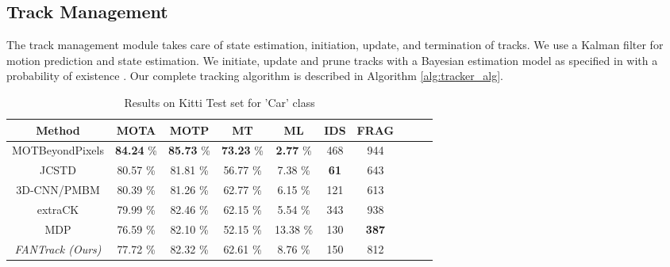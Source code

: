 \documentclass[letterpaper, 10 pt, conference]{ieeeconf}
\begin{document}
\subsection{Track Management}
The track management module takes care of state estimation, initiation, update, and termination of tracks. We use a Kalman filter for motion prediction and state estimation. We initiate, update and prune tracks with a Bayesian estimation model as specified in \cite{Pak2016JointTD} with a probability of existence . Our complete tracking algorithm is described in Algorithm \ref{alg:tracker_alg}.

\begin{table*}[ht]
\vspace{1.5em}
\caption{Results on Kitti Test set for 'Car' class}
\centering
\begin{tabular}{c | c | c | c | c | c | c | c | c | c}
\hline \hline
{\bf Method} & {\bf MOTA } & {\bf MOTP } & {\bf MT } & {\bf ML } & {\bf IDS } & {\bf FRAG }\\ 
\hline \hline
MOTBeyondPixels \cite{beyondmot} & {\bf84.24} \% & {\bf85.73} \% & {\bf73.23} \% & {\bf2.77} \% & 468 & 944\\
JCSTD \cite{xiao2010vehicle} & 80.57 \% & 81.81 \% & 56.77 \% & 7.38 \% & {\bf61} & 643\\
3D-CNN/PMBM \cite{scheidegger2018mono} & 80.39 \% & 81.26 \% & 62.77 \% & 6.15 \% & 121 & 613\\
extraCK \cite{gunduz2018lightweight} & 79.99 \% & 82.46 \% & 62.15 \% & 5.54 \% & 343 & 938\\
MDP \cite{xiang2015learning} & 76.59 \% & 82.10 \% & 52.15 \% & 13.38 \% & 130 & {\bf387}\\
\hline
\textit{FANTrack (Ours)} & 77.72 \% & 82.32 \% & 62.61 \% & 8.76 \% & 150 &
812\\
\hline \hline
\end{tabular}
\label{table:testresults}
\vspace{-1.5em}
\end{table*}
\end{document}

